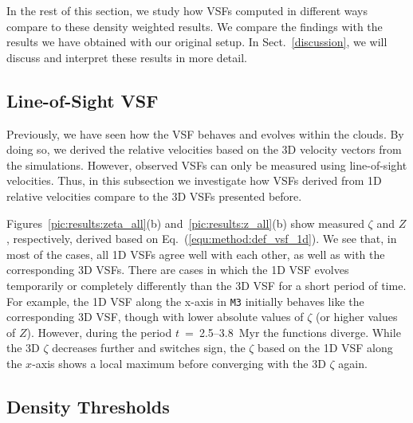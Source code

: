 In the rest of this section, we study how VSFs computed in different ways compare to these density weighted results.
We compare the findings with the results we have obtained with our original setup.
In Sect.~\ref{discussion}, we will discuss and interpret these results in more detail.


\subsection{Line-of-Sight VSF}\label{results:1d}

Previously, we have seen how the VSF behaves and evolves within the clouds.
By doing so, we derived the relative velocities based on the 3D velocity vectors from the simulations.
However, observed VSFs can only be measured using line-of-sight velocities.
Thus, in this subsection we investigate how VSFs derived from 1D relative velocities compare to the 3D VSFs presented before.

Figures~\ref{pic:results:zeta_all}(b) and~\ref{pic:results:z_all}(b) show measured $\zeta$ and $Z$, respectively, derived based on Eq.~(\ref{equ:method:def_vsf_1d}). 
We see that, in most of the cases, all 1D VSFs agree well with each other, as well as with the corresponding 3D VSFs.
There are cases in which the 1D VSF evolves temporarily or completely differently than the 3D VSF for a short period of time.
For example, the 1D VSF along the x-axis in \texttt{M3} initially behaves like the corresponding 3D VSF, though with lower absolute values of $\zeta$ (or higher values of $Z$).
However, during the period $t$~=~2.5--3.8~Myr the functions diverge. 
While the 3D $\zeta$ decreases further and switches sign, the $\zeta$ based on the 1D VSF along the $x$-axis shows a local maximum before converging with the 3D $\zeta$ again. 




\subsection{Density Thresholds}\label{results:densthres}


